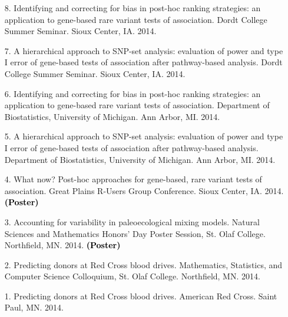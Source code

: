 \documentclass[margin]{res}
\newcommand{\annotate}[1]{\textcolor{black}{\textbf{(#1)}}}
\begin{document}
\begin{resume}
\begin{itemize}
\item[8.] %
Identifying and correcting for bias in post-hoc ranking strategies: an application to gene-based rare variant tests of association. 
Dordt College Summer Seminar. Sioux Center, IA. 2014.

\item[7.] %
A hierarchical approach to SNP-set analysis: evaluation of power and type I error of gene-based tests of association after pathway-based analysis. 
Dordt College Summer Seminar. Sioux Center, IA. 2014.

\item[6.] %
Identifying and correcting for bias in post-hoc ranking strategies: an application to gene-based rare variant tests of association. 
Department of Biostatistics, University of Michigan. Ann Arbor, MI. 2014.

\item[5.] %
A hierarchical approach to SNP-set analysis: evaluation of power and type I error of gene-based tests of association after pathway-based analysis. 
Department of Biostatistics, University of Michigan. Ann Arbor, MI. 2014.

\item[4.] %
What now? Post-hoc approaches for gene-based, rare variant tests of association. 
Great Plains R-Users Group Conference. Sioux Center, IA. 2014. 
\annotate{Poster}

\item[3.] %
Accounting for variability in paleoecological mixing models. 
Natural Sciences and Mathematics Honors’ Day Poster Session, St. Olaf College. Northfield, MN. 2014. 
\annotate{Poster}


\item[2.] %
Predicting donors at Red Cross blood drives. 
Mathematics, Statistics, and Computer Science Colloquium, St. Olaf College. Northfield, MN. 2014.

\item[1.] %
Predicting donors at Red Cross blood drives. 
American Red Cross. Saint Paul, MN. 2014.%


\end{itemize}
\end{resume}
\end{document}
